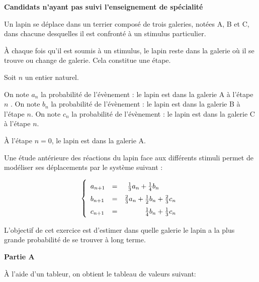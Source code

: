 \documentclass[10pt,a4paper]{article}
\begin{document}
\textbf{Candidats n'ayant pas suivi l'enseignement de spécialité}

\medskip

Un lapin se déplace dans un terrier composé de trois galeries, notées A, B et C, dans chacune desquelles il est confronté à un stimulus particulier.

À chaque fois qu'il est soumis à un stimulus, le lapin reste dans la galerie où il se trouve ou change de galerie. Cela constitue une étape.

\smallskip

Soit $n$ un entier naturel.

On note $a_n$ la probabilité de l'évènement : \og le lapin est dans la galerie A à l'étape $n$ \fg.
On note $b_n$ la probabilité de l'évènement : \og le lapin est dans la galerie B à l'étape $n $\fg.
On note $c_n$ la probabilité de l'évènement : \og le lapin est dans la galerie C à l'étape $n $\fg.

À l'étape $n = 0$, le lapin est dans la galerie A.

Une étude antérieure des réactions du lapin face aux différents stimuli permet de modéliser ses déplacements par le système suivant :

\[\renewcommand\arraystretch{1.5}\left\{\begin{array}{l c r}
a_{n+1}&=&\frac{1}{3}a_n + \frac{1}{4} b_n \phantom{+ \frac{2}{3}c_n}\\
b_{n+1}&=&\frac{2}{3}a_n + \frac{1}{2} b_n + \frac{2}{3}c_n\\
c_{n+1}&=&\frac{1}{4}b_n + \frac{1}{3} c_n
\end{array}\right.\]

\medskip

L'objectif de cet exercice est d'estimer dans quelle galerie le lapin a la plus grande probabilité de se trouver à long terme.

\bigskip

\textbf{Partie A}

\medskip

À l'aide d'un tableur, on obtient le tableau de valeurs suivant:
\end{document}
